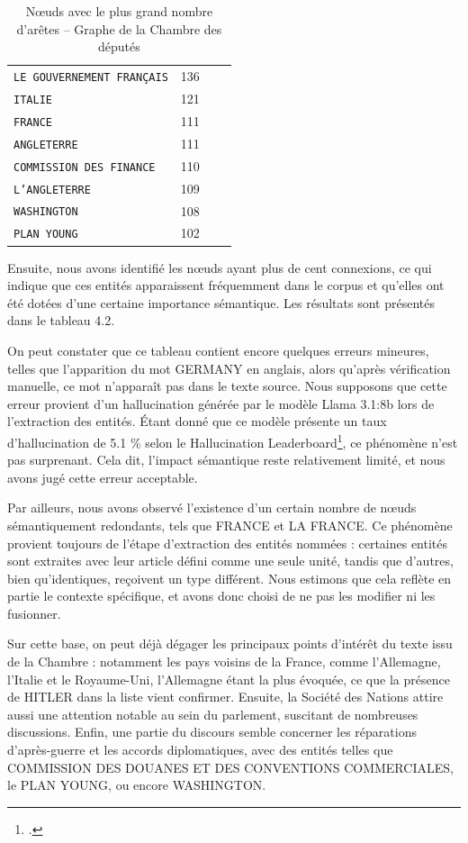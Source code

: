 \documentclass[a4paper,twoside,12pt]{book}
\begin{document}
\begin{table}[ht]
\begin{tabular}{ll@{\hskip 1cm}ll}
\texttt{LE GOUVERNEMENT FRANÇAIS} & 136 \\
\texttt{ITALIE} & 121 \\
\texttt{FRANCE} & 111 \\
\texttt{ANGLETERRE} & 111 \\
\texttt{COMMISSION DES FINANCE} & 110 \\
\texttt{L'ANGLETERRE} & 109 \\
\texttt{WASHINGTON} & 108 \\
\texttt{PLAN YOUNG} & 102 \\
\hline
\end{tabular}
\caption{Nœuds avec le plus grand nombre d'arêtes – Graphe de la Chambre des députés}
\label{tab:features_table}
\end{table}

Ensuite, nous avons identifié les nœuds ayant plus de cent connexions, ce qui indique que ces entités apparaissent fréquemment dans le corpus et qu'elles ont été dotées d'une certaine importance sémantique. Les résultats sont présentés dans le tableau 4.2.

On peut constater que ce tableau contient encore quelques erreurs mineures, telles que l'apparition du mot GERMANY en anglais, alors qu'après vérification manuelle, ce mot n'apparaît pas dans le texte source. Nous supposons que cette erreur provient d'un hallucination générée par le modèle Llama 3.1:8b lors de l'extraction des entités. Étant donné que ce modèle présente un taux d'hallucination de 5.1 \% selon le Hallucination Leaderboard\footcite{zotero-768}, ce phénomène n'est pas surprenant. Cela dit, l'impact sémantique reste relativement limité, et nous avons jugé cette erreur acceptable.

Par ailleurs, nous avons observé l'existence d'un certain nombre de nœuds sémantiquement redondants, tels que FRANCE et LA FRANCE. Ce phénomène provient toujours de l'étape d'extraction des entités nommées : certaines entités sont extraites avec leur article défini comme une seule unité, tandis que d'autres, bien qu'identiques, reçoivent un type différent. Nous estimons que cela reflète en partie le contexte spécifique, et avons donc choisi de ne pas les modifier ni les fusionner.

Sur cette base, on peut déjà dégager les principaux points d'intérêt du texte issu de la Chambre : notamment les pays voisins de la France, comme l'Allemagne, l'Italie et le Royaume-Uni, l'Allemagne étant la plus évoquée, ce que la présence de HITLER dans la liste vient confirmer. Ensuite, la Société des Nations attire aussi une attention notable au sein du parlement, suscitant de nombreuses discussions. Enfin, une partie du discours semble concerner les réparations d'après-guerre et les accords diplomatiques, avec des entités telles que COMMISSION DES DOUANES ET DES CONVENTIONS COMMERCIALES, le PLAN YOUNG, ou encore WASHINGTON.
\end{document}
